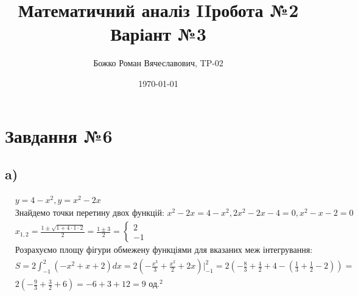 \documentclass{report}
\begin{document}
\title{Математичний аналіз II робота №2\\Варіант №3}
\author{Божко Роман Вячеславович, TP-02}
\date{\today}

\maketitle

\section{Завдання №6}
\subsection{a)}
\begin{equation}\label{eq1_a}\begin{split}
	& y = 4-x^2, y=x^2 - 2x\\
	& \text{Знайдемо точки перетину двох функцій: } x^2 - 2x = 4 - x^2, 2x^2 - 2x - 4 = 0, x^2 - x - 2 = 0\\
	& x_{1, 2} = \frac{1 \pm \sqrt{1 + 4 \cdot 1 \cdot 2}}{2} = \frac{1\pm3}{2} = \begin{cases}2\\-1\end{cases}\\
	& \text{Розрахуємо площу фігури обмежену функціями для вказаних меж інтегрування: }\\
	& S = 2\int_{-1}^{2} (-x^2 + x + 2)dx = 2\left(-\frac{x^3}{3} + \frac{x^2}{2} +2x\right)\bigg|_{-1}^{2} = 2\left(-\frac{8}{3} + \frac{4}{2} + 4 - \left(\frac{1}{3} + \frac{1}{2} - 2\right)\right) =\\
	& 2\left(-\frac{9}{3} + \frac{3}{2} + 6\right)= -6 + 3 + 12 = 9 \text{ од.}^2
\end{split}\end{equation}
\end{document}

